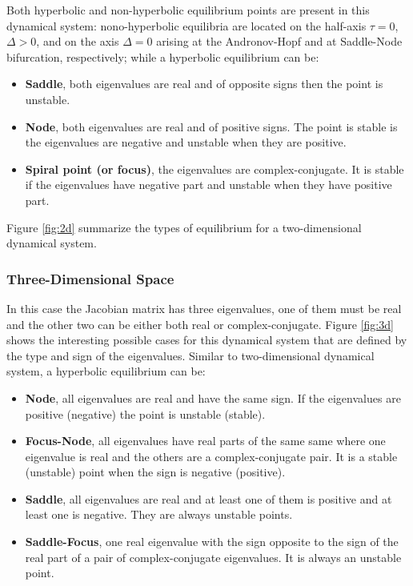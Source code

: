 Both hyperbolic and non-hyperbolic equilibrium points are present in this dynamical system: nono-hyperbolic equilibria are located on the half-axis $\tau =0$, $\Delta>0$, and on the axis $\Delta=0$ arising at the Andronov-Hopf and at Saddle-Node bifurcation, respectively; while a hyperbolic equilibrium can be: 

\begin{itemize}
    \item \textbf{Saddle}, both eigenvalues are real and of opposite signs then the point is unstable.
    \item \textbf{Node}, both eigenvalues are real and of positive signs. The point is stable is the eigenvalues are negative and unstable when they are positive.
    
    \item \textbf{Spiral point (or focus)}, the eigenvalues are complex-conjugate. It is stable if the eigenvalues have negative part and unstable when they have positive part.
\end{itemize}

Figure \ref{fig:2d} summarize the types of equilibrium for a two-dimensional dynamical system.

\subsubsection{Three-Dimensional Space}

In this case the Jacobian matrix has three eigenvalues, one of them must be real and the other two can be either both real or complex-conjugate. Figure \ref{fig:3d} shows the interesting possible cases for this dynamical system that are defined by the type and sign of the eigenvalues. Similar to two-dimensional dynamical system, a hyperbolic equilibrium can be: \\

\begin{itemize}
    \item \textbf{Node}, all eigenvalues are real and have the same sign. If the eigenvalues are positive (negative) the point is unstable (stable).
    \item \textbf{Focus-Node}, all eigenvalues have real parts of the same same where one eigenvalue is real and the others are a complex-conjugate pair. It is a stable (unstable) point when the sign is negative (positive).
    \item \textbf{Saddle}, all eigenvalues are real and at least one of them is positive and at least one is negative. They are always unstable points.
    \item \textbf{Saddle-Focus}, one real eigenvalue with the sign opposite to the sign of the real part of a pair of complex-conjugate eigenvalues. It is always an unstable point.
\end{itemize}


